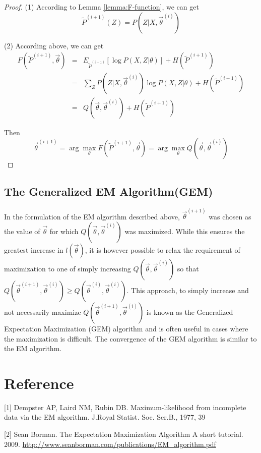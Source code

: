 \begin{proof}
(1) According to Lemma \ref{lemma:F-function}, we can get
\begin{equation}
\tilde{P}^{(i+1)}(Z)=P(Z|X, \vec{\theta}^{(i)}) \nonumber
\end{equation}

(2) According above, we can get
\begin{eqnarray}
F(\tilde{P}^{(i+1)},\vec{\theta}) &=& E_{\tilde{P}^{(i+1)}}\left[\log{P(X,Z|\theta)}\right]+H(\tilde{P}^{(i+1)}) \nonumber \\
    &=& \sum\limits_Z{P(Z|X,\vec{\theta}^{(i)})\log{P(X,Z|\theta)}}+H(\tilde{P}^{(i+1)}) \nonumber \\
	&=& Q(\vec{\theta}, \vec{\theta}^{(i)})+H(\tilde{P}^{(i+1)})\nonumber
\end{eqnarray}

Then
\begin{equation}
\vec{\theta}^{(i+1)}=\arg\max\limits_{\theta}F(\tilde{P}^{(i+1)},\vec{\theta})=\arg\max\limits_{\theta}Q(\vec{\theta}, \vec{\theta}^{(i)}) \nonumber
\end{equation}
\end{proof}


\subsection{The Generalized EM Algorithm(GEM)}
In the formulation of the EM algorithm described above, $\vec{\theta}^{(i+1)}$ was chosen as the value of $\vec{\theta}$ for which $Q(\vec{\theta}, \vec{\theta}^{(i)})$ was maximized. While this ensures the greatest increase in $l(\vec{\theta})$, it is however possible to relax the requirement of maximization to one of simply increasing $Q(\vec{\theta}, \vec{\theta}^{(i)})$ so that $Q(\vec{\theta}^{(i+1)}, \vec{\theta}^{(i)}) \geq Q(\vec{\theta}^{(i)}, \vec{\theta}^{(i)})$. This approach, to simply increase and not necessarily maximize $Q(\vec{\theta}^{(i+1)}, \vec{\theta}^{(i)})$ is known as the Generalized Expectation Maximization (GEM) algorithm and is often useful in cases where the maximization is difficult. The convergence of the GEM algorithm is similar to the EM algorithm.


\section{Reference}
[1] Dempster AP, Laird NM, Rubin DB. Maximum-likelihood from incomplete data via the EM algorithm. J.Royal Statist. Soc. Ser.B., 1977, 39

[2] Sean Borman. The Expectation Maximization Algorithm A short tutorial. 2009. \url{http://www.seanborman.com/publications/EM_algorithm.pdf}